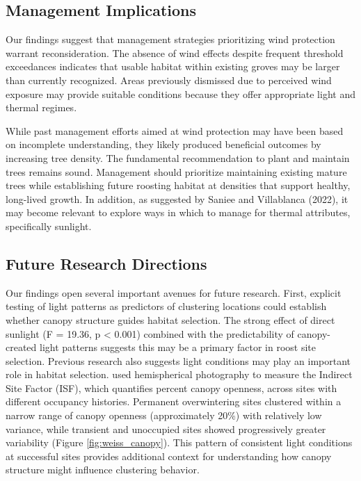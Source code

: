 \subsection{Management Implications}

Our findings suggest that management strategies prioritizing wind protection warrant reconsideration. The absence of wind effects despite frequent threshold exceedances indicates that usable habitat within existing groves may be larger than currently recognized. Areas previously dismissed due to perceived wind exposure may provide suitable conditions because they offer appropriate light and thermal regimes.

While past management efforts aimed at wind protection may have been based on incomplete understanding, they likely produced beneficial outcomes by increasing tree density. The fundamental recommendation to plant and maintain trees remains sound. Management should prioritize maintaining existing mature trees while establishing future roosting habitat at densities that support healthy, long-lived growth. In addition, as suggested by Saniee and Villablanca (2022), it may become relevant to explore ways in which to manage for thermal attributes, specifically sunlight.

\subsection{Future Research Directions}

Our findings open several important avenues for future research. First, explicit testing of light patterns as predictors of clustering locations could establish whether canopy structure guides habitat selection. The strong effect of direct sunlight (F = 19.36, p < 0.001) combined with the predictability of canopy-created light patterns suggests this may be a primary factor in roost site selection. Previous research also suggests light conditions may play an important role in habitat selection. \autocite{Weiss1991_ESKZGQJV} used hemispherical photography to measure the Indirect Site Factor (ISF), which quantifies percent canopy openness, across sites with different occupancy histories. Permanent overwintering sites clustered within a narrow range of canopy openness (approximately 20\%) with relatively low variance, while transient and unoccupied sites showed progressively greater variability (Figure \ref{fig:weiss_canopy}). This pattern of consistent light conditions at successful sites provides additional context for understanding how canopy structure might influence clustering behavior.

